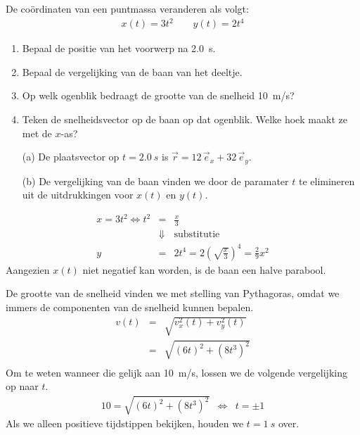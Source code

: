 \documentclass{ximera}
\begin{document}
\begin{exercise}





 De co\"ordinaten van een puntmassa veranderen als volgt:
\begin{eqnarray*}
	x(t)=3t^2\qquad y(t)=2t^4
\end{eqnarray*}
\begin{enumerate}
\item Bepaal de positie van het voorwerp na \SI{2,0}{s}.%
\item Bepaal de vergelijking van de baan van het deeltje.
\item Op welk ogenblik bedraagt de grootte van de snelheid \SI{10}{m/s}?
\item Teken de snelheidsvector op de baan op dat ogenblik. Welke hoek maakt ze met de $x$-as?
\end{enumerate}

\begin{oplossing}
\begin{itemize}
	\item[(a)] De plaatsvector op $t=\SI{2,0}{s}$ is $\vec{r}=12\,\vec{e}_x+32\,\vec{e}_y$.
	\item[(b)] De vergelijking van de baan vinden we door de paramater $t$ te elimineren uit de uitdrukkingen voor $x(t)$ en $y(t)$.
\end{itemize}
\begin{eqnarray*}
x=3t^2\Leftrightarrow t^2&=&\frac{x}{3}\\
&\Downarrow&\mathrm{substitutie}\\
y&=&2t^4=2\left(\sqrt{\frac{x}{3}}\right)^4=\frac{2}{9}x^2
\end{eqnarray*}
Aangezien $x(t)$ niet negatief kan worden, is de baan een halve parabool.

De grootte van de snelheid vinden we met stelling van Pythagoras, omdat we immers de componenten van de snelheid kunnen bepalen.
\begin{eqnarray*}
v(t)&=&\sqrt{v_x^2(t)+v_y^2(t)}\\
&=&\sqrt{(6t)^2+\left(8t^3\right)^2}\\
\end{eqnarray*}
Om te weten wanneer die gelijk aan \SI{10}{m/s}, lossen we de volgende vergelijking op naar $t$.
\begin{eqnarray*}
10=\sqrt{(6t)^2+\left(8t^3\right)^2}&\Leftrightarrow&t=\pm 1
\end{eqnarray*}
Als we alleen positieve tijdstippen bekijken, houden we $t=\SI{1}{s}$ over. 


\end{oplossing}
\end{exercise}
\end{document}
